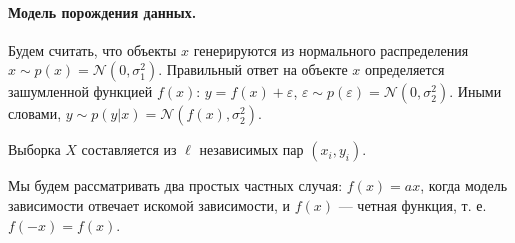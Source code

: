 \documentclass[12pt,fleqn]{article}
\begin{document}
    \paragraph{Модель порождения данных.} Будем считать, что объекты $x$ генерируются из нормального распределения $x \sim p(x) = \mathcal{N}(0, \sigma_1^2)$. Правильный ответ на объекте $x$ определяется зашумленной функцией $f(x)$: $y = f(x) + \varepsilon$, $\varepsilon \sim p(\varepsilon) = \mathcal{N}(0, \sigma_2^2)$. Иными словами, $y \sim p(y|x) = \mathcal{N}(f(x), \sigma_2^2)$. 
    
    Выборка $X$ составляется из $\ell$ независимых пар $(x_i, y_i)$. 
    
    Мы будем рассматривать два простых частных случая: $f(x) = ax$, когда модель зависимости отвечает искомой зависимости, и $f(x)$ --- четная функция, т. е. $f(-x) = f(x)$.  
    
\end{document}
